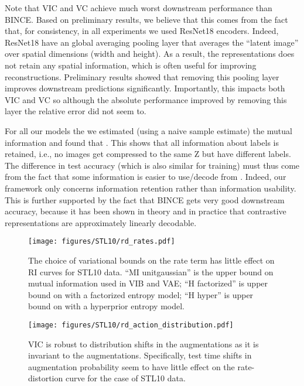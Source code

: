 \documentclass[final]{article}
\begin{document}
 
Note that VIC and VC achieve much worst downstream performance than BINCE.
Based on preliminary results, we believe that this comes from the fact that, for consistency, in all experiments we used ResNet18 encoders.
Indeed, ResNet18 have an global averaging pooling layer that averages the ``latent image'' over spatial dimensions (width and height).
As a result, the representations  does not retain any spatial information, which is often useful for improving reconstructions.
Preliminary results showed that removing this pooling layer improves downstream predictions significantly.
Importantly, this impacts both VIC and VC so although the absolute performance improved by removing this layer the relative error did not seem to.

 For all our models the we estimated (using a naive sample estimate) the mutual information  and found that .  This shows that all information about labels is retained, i.e., no images get compressed to the same Z but have different labels. The difference in test accuracy (which is also similar for training) must thus come from the fact that some information is easier to use/decode from \cite{dubois_learning_2020,xu_theory_2020}.
Indeed, our framework only concerns information retention rather than information usability. 
This is further supported by the fact that BINCE gets very good downstream accuracy, because it has been shown in theory \cite{saunshi_theoretical_2019,tosh_contrastive_2021,lee_predicting_2020} and in practice \cite{chen_simple_2020,oord_representation_2019} that contrastive representations are approximately linearly decodable.


\begin{figure}[!htb]
    \centering
    \begin{minipage}{.44\textwidth}
        \centering
        \texttt{[image: figures/STL10/rd\_rates.pdf]}
        \caption{The choice of variational bounds on the rate term  has little effect on RI curves for STL10 data.
        ``MI unitgaussian'' is the upper bound on mutual information used in VIB and VAE;
        ``H factorized'' is  upper bound on  with a factorized entropy model;
        ``H hyper'' is  upper bound on  with a hyperprior entropy model.}
        \label{fig:rate_rd}
    \end{minipage}\hspace{0.1\textwidth}
    \begin{minipage}{0.44\textwidth}
        \centering 
        \texttt{[image: figures/STL10/rd\_action\_distribution.pdf]}
        \caption{VIC is robust to distribution shifts in the augmentations as it is invariant to the augmentations.
        Specifically, test time shifts in augmentation probability seem to have little effect on the rate-distortion curve for the case of STL10 data.}
        \label{fig:action_dist_rd}
    \end{minipage}
\end{figure}
\end{document}
